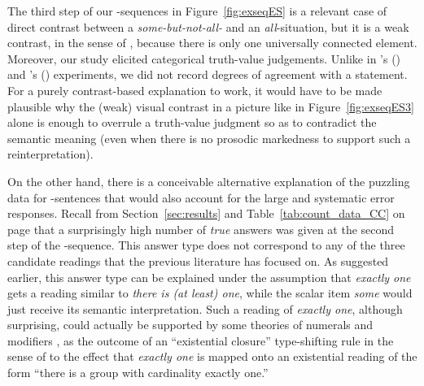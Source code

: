 \documentclass[fleqn,reqno,10pt]{article}
\renewcommand{\es}{\acro{es}}
\begin{document}
The third step of our \es-sequences in Figure~\ref{fig:exseqES} is a
relevant case of direct contrast between a \emph{some-but-not-all-}
and an \emph{all}-situation, but it is a weak contrast, in the sense
of \citet{GeurtsTielvan-Tiel2013:Embedded-Scalar}, because there is
only one universally connected element. Moreover, our study elicited
categorical truth-value judgements. Unlike in
\citeauthor{ChemlaSpector2010:Experimental-Ev}'s
(\citeyear{ChemlaSpector2010:Experimental-Ev}) and
\citeauthor{GeurtsTielvan-Tiel2013:Embedded-Scalar}'s
(\citeyear{GeurtsTielvan-Tiel2013:Embedded-Scalar}) experiments, we
did not record degrees of agreement with a statement. For a purely
contrast-based explanation to work, it would have to be made plausible
why the (weak) visual contrast in a picture like in
Figure~\ref{fig:exseqES3} alone is enough to overrule a truth-value
judgment so as to contradict the semantic meaning (even when there is
no prosodic markedness to support such a reinterpretation).

On the other hand, there is a conceivable alternative explanation of
the puzzling data for \es-sentences that would also account for the
large and systematic error responses. Recall from
Section~\ref{sec:results} and Table~\ref{tab:count_data_CC} on page
\pageref{tab:count_data_CC} that a surprisingly high number of
\emph{true} answers was given at the second step of the
\es-sequence. This answer type does not correspond to any of the three
candidate readings that the previous literature has focused on. As
suggested earlier, this answer type can be explained under the
assumption that \emph{exactly one} gets a reading similar to
\emph{there is (at least) one}, while the scalar item \emph{some}
would just receive its semantic interpretation. Such a reading of
\emph{exactly one}, although surprising, could actually be supported
by some theories of numerals and modifiers
\citep[e.g.][]{Geurts2006:Take-five,MartyChemla2014:Phantom-reading},
as the outcome of an ``existential closure'' type-shifting rule in the
sense of \citet{Partee1987:Noun-phrase-int} to the effect that
\emph{exactly one} is mapped onto an existential reading of the form
``there is a group with cardinality exactly one.''
\end{document}
